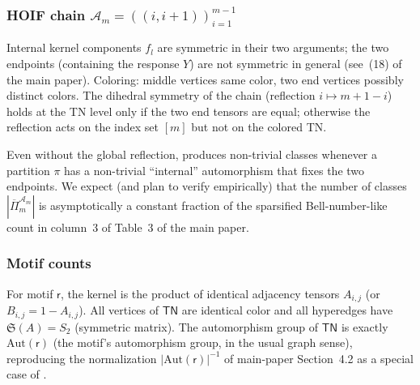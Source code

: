 \documentclass[11pt]{article}
\newcommand{\calA}{\mathcal{A}}
\newcommand{\TN}{\mathsf{TN}}
\newcommand{\Aut}{\mathrm{Aut}}
\newcommand{\Sym}{\mathfrak{S}}
\newcommand{\sfr}{\mathsf{r}}
\theoremstyle{plain}
\theoremstyle{definition}
\begin{document}
\subsubsection*{HOIF chain $\calA_m=((i,i+1))_{i=1}^{m-1}$}

Internal kernel components $f_l$ are symmetric in their two arguments; the
two endpoints (containing the response $Y$) are not symmetric in general
(see~(18) of the main paper).  Coloring: middle vertices same color, two
end vertices possibly distinct colors.  The dihedral symmetry of the chain
(reflection $i\mapsto m+1-i$) holds at the TN level only if the two end
tensors are equal; otherwise the reflection acts on the index set $[m]$ but
not on the colored TN.

Even without the global reflection,  produces
non-trivial classes whenever a partition $\pi$ has a non-trivial
``internal'' automorphism that fixes the two endpoints.  We expect (and
plan to verify empirically) that the number of classes
$|\overline{\Pi}_m^{\calA_m}|$ is asymptotically a constant fraction of the
sparsified Bell-number-like count in column~3 of Table~3 of the main paper.

\subsubsection*{Motif counts}

For motif $\sfr$, the kernel is the product of identical adjacency tensors
$A_{i,j}$ (or $B_{i,j}=1-A_{i,j}$).  All vertices of $\TN$ are identical
color and all hyperedges have $\Sym(A)=S_2$ (symmetric matrix).  The
automorphism group of $\TN$ is exactly $\Aut(\sfr)$ (the motif's
automorphism group, in the usual graph sense), reproducing the
normalization $|\Aut(\sfr)|^{-1}$ of main-paper Section~4.2 as a special
case of .
\end{document}
